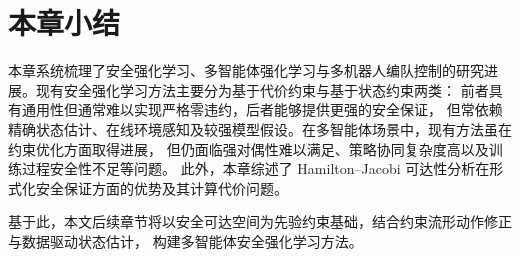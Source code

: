 
\section{本章小结}

本章系统梳理了安全强化学习、多智能体强化学习与多机器人编队控制的研究进展。现有安全强化学习方法主要分为基于代价约束与基于状态约束两类：
前者具有通用性但通常难以实现严格零违约，后者能够提供更强的安全保证，
但常依赖精确状态估计、在线环境感知及较强模型假设。在多智能体场景中，现有方法虽在约束优化方面取得进展，
但仍面临强对偶性难以满足、策略协同复杂度高以及训练过程安全性不足等问题。
此外，本章综述了 Hamilton--Jacobi 可达性分析在形式化安全保证方面的优势及其计算代价问题。

基于此，本文后续章节将以安全可达空间为先验约束基础，结合约束流形动作修正与数据驱动状态估计，
构建多智能体安全强化学习方法。
